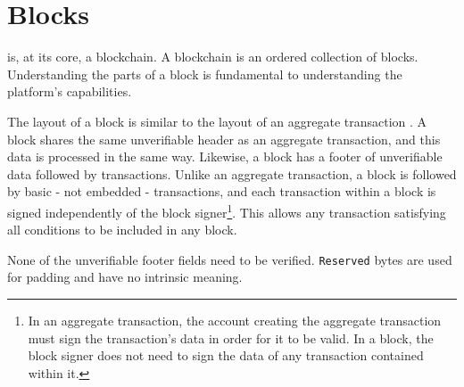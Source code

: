 \section{Blocks}
\label{sec:blocks}


\codenamechapterfirstword is, at its core, a blockchain.
A blockchain is an ordered collection of blocks.
Understanding the parts of a \codenamespace block is fundamental to understanding the platform's capabilities.

The layout of a block is similar to the layout of an aggregate transaction .
A block shares the same unverifiable header as an aggregate transaction, and this data is processed in the same way.
Likewise, a block has a footer of unverifiable data followed by transactions.
Unlike an aggregate transaction, a block is followed by basic - not embedded - transactions, and each transaction within a block is signed independently of the block signer\footnote{
In an aggregate transaction, the account creating the aggregate transaction must sign the transaction's data in order for it to be valid.
In a block, the block signer does not need to sign the data of any transaction contained within it.
}.
This allows any transaction satisfying all conditions to be included in any block.

None of the unverifiable footer fields need to be verified.
\texttt{Reserved} bytes are used for padding and have no intrinsic meaning.

